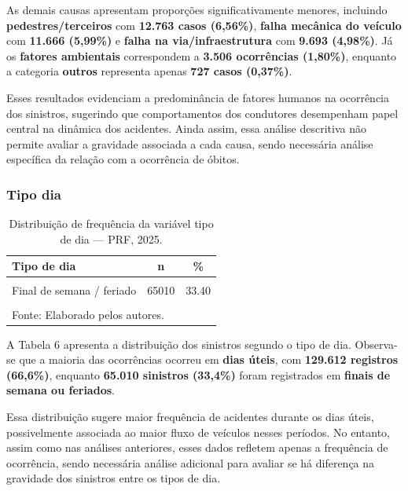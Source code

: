 \documentclass[
  brazilian,
  12pt,
]{article}
\begin{document}
As demais causas apresentam proporções significativamente menores,
incluindo \textbf{pedestres/terceiros} com \textbf{12.763 casos
(6,56\%)}, \textbf{falha mecânica do veículo} com \textbf{11.666
(5,99\%)} e \textbf{falha na via/infraestrutura} com \textbf{9.693
(4,98\%)}. Já os \textbf{fatores ambientais} correspondem a
\textbf{3.506 ocorrências (1,80\%)}, enquanto a categoria
\textbf{outros} representa apenas \textbf{727 casos (0,37\%)}.

Esses resultados evidenciam a predominância de fatores humanos na
ocorrência dos sinistros, sugerindo que comportamentos dos condutores
desempenham papel central na dinâmica dos acidentes. Ainda assim, essa
análise descritiva não permite avaliar a gravidade associada a cada
causa, sendo necessária análise específica da relação com a ocorrência
de óbitos.

\subsubsection{Tipo dia}\label{tipo-dia}

\begingroup\fontsize{11}{13}\selectfont

\begin{longtable}[t]{lcc}
\caption{\label{tab:tab6}Distribuição de frequência da variável tipo de dia — PRF, 2025.}\\
\toprule
Tipo de dia & n & \%\\
\midrule
\cellcolor{gray!10}{Dia útil} & \cellcolor{gray!10}{129612} & \cellcolor{gray!10}{66.60}\\
Final de semana / feriado & 65010 & 33.40\\
\textbf{\cellcolor{gray!10}{Total}} & \textbf{\cellcolor{gray!10}{194622}} & \textbf{\cellcolor{gray!10}{100.00}}\\
\bottomrule
\multicolumn{3}{l}{\rule{0pt}{1em}Fonte: Elaborado pelos autores.}\\
\end{longtable}
\endgroup{}

A Tabela 6 apresenta a distribuição dos sinistros segundo o tipo de dia.
Observa-se que a maioria das ocorrências ocorreu em \textbf{dias úteis},
com \textbf{129.612 registros (66,6\%)}, enquanto \textbf{65.010
sinistros (33,4\%)} foram registrados em \textbf{finais de semana ou
feriados}.

Essa distribuição sugere maior frequência de acidentes durante os dias
úteis, possivelmente associada ao maior fluxo de veículos nesses
períodos. No entanto, assim como nas análises anteriores, esses dados
refletem apenas a frequência de ocorrência, sendo necessária análise
adicional para avaliar se há diferença na gravidade dos sinistros entre
os tipos de dia.
\end{document}
